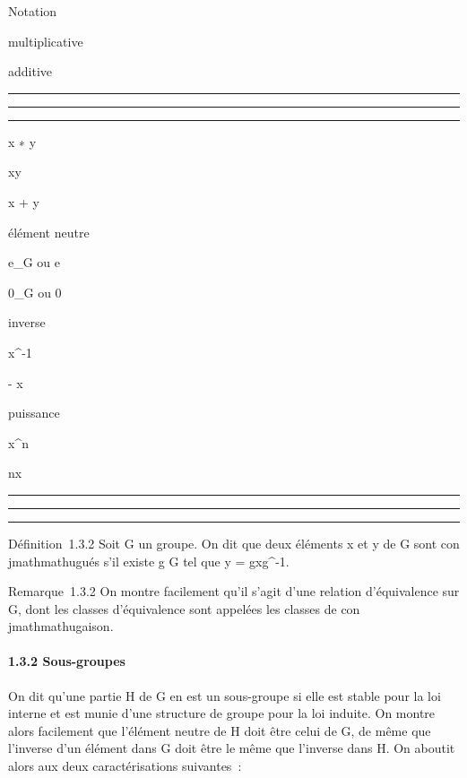 Notation

multiplicative

additive

\begin{center}\rule{3in}{0.4pt}\end{center}

\begin{center}\rule{3in}{0.4pt}\end{center}

\begin{center}\rule{3in}{0.4pt}\end{center}

x ∗ y

xy

x + y

élément neutre

e_G ou e

0_G ou 0

inverse

x^-1

- x

puissance

x^n

nx

\begin{center}\rule{3in}{0.4pt}\end{center}

\begin{center}\rule{3in}{0.4pt}\end{center}

\begin{center}\rule{3in}{0.4pt}\end{center}

Définition~1.3.2 Soit G un groupe. On dit que deux éléments x et y de G
sont con\\jmathmathugués s'il existe g \in G tel que y = gxg^-1.

Remarque~1.3.2 On montre facilement qu'il s'agit d'une relation
d'équivalence sur G, dont les classes d'équivalence sont appelées les
classes de con\\jmathmathugaison.

\paragraph{1.3.2 Sous-groupes}

On dit qu'une partie H de G en est un sous-groupe si elle est stable
pour la loi interne et est munie d'une structure de groupe pour la loi
induite. On montre alors facilement que l'élément neutre de H doit être
celui de G, de même que l'inverse d'un élément dans G doit être le même
que l'inverse dans H. On aboutit alors aux deux caractérisations
suivantes~:

